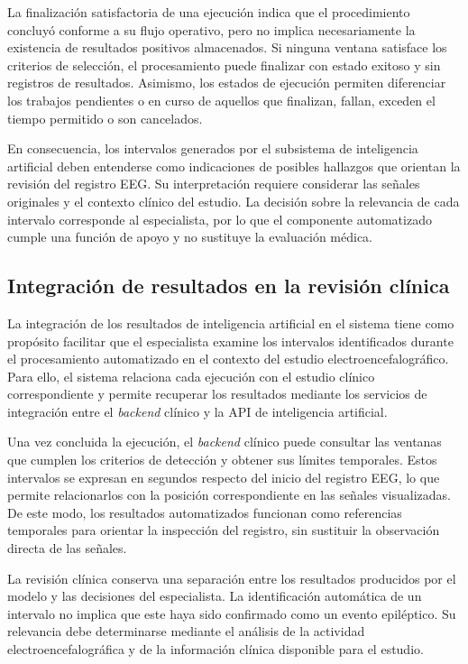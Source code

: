 La finalización satisfactoria de una ejecución indica que el procedimiento concluyó conforme a su flujo operativo, pero no implica necesariamente la existencia de resultados positivos almacenados. Si ninguna ventana satisface los criterios de selección, el procesamiento puede finalizar con estado exitoso y sin registros de resultados. Asimismo, los estados de ejecución permiten diferenciar los trabajos pendientes o en curso de aquellos que finalizan, fallan, exceden el tiempo permitido o son cancelados.

En consecuencia, los intervalos generados por el subsistema de inteligencia artificial deben entenderse como indicaciones de posibles hallazgos que orientan la revisión del registro EEG. Su interpretación requiere considerar las señales originales y el contexto clínico del estudio. La decisión sobre la relevancia de cada intervalo corresponde al especialista, por lo que el componente automatizado cumple una función de apoyo y no sustituye la evaluación médica.


\subsection{Integración de resultados en la revisión clínica}
\label{subsec:integracion-resultados-revision-clinica}

La integración de los resultados de inteligencia artificial en el sistema tiene como propósito facilitar que el especialista examine los intervalos identificados durante el procesamiento automatizado en el contexto del estudio electroencefalográfico. Para ello, el sistema relaciona cada ejecución con el estudio clínico correspondiente y permite recuperar los resultados mediante los servicios de integración entre el \textit{backend} clínico y la API de inteligencia artificial.

Una vez concluida la ejecución, el \textit{backend} clínico puede consultar las ventanas que cumplen los criterios de detección y obtener sus límites temporales. Estos intervalos se expresan en segundos respecto del inicio del registro EEG, lo que permite relacionarlos con la posición correspondiente en las señales visualizadas. De este modo, los resultados automatizados funcionan como referencias temporales para orientar la inspección del registro, sin sustituir la observación directa de las señales.

La revisión clínica conserva una separación entre los resultados producidos por el modelo y las decisiones del especialista. La identificación automática de un intervalo no implica que este haya sido confirmado como un evento epiléptico. Su relevancia debe determinarse mediante el análisis de la actividad electroencefalográfica y de la información clínica disponible para el estudio.

